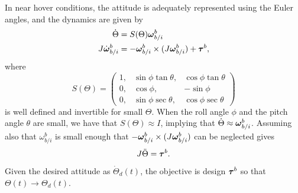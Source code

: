 In near hover conditions, the attitude is adequately represented using the Euler angles, and the dynamics are given by
\begin{align*}
	\dot{\Theta} &= S(\Theta)\boldsymbol{\omega}_{b/i}^b \\	
	J\dot{\boldsymbol{\omega}}_{b/i}^b &= -\boldsymbol{\omega}_{b/i}^b \times (J\boldsymbol{\omega}_{b/i}^b) + \boldsymbol{\tau}^b,
\end{align*}
where 
\[
S(\Theta)= \begin{pmatrix} 1, & \sin\phi\tan\theta, & \cos\phi\tan\theta \\
 0, & \cos\phi, & -\sin\phi \\
 0, & \sin\phi\sec\theta, & \cos\phi\sec\theta
 \end{pmatrix}
\]
is well defined and invertible for small $\Theta$.  When the roll angle $\phi$ and the pitch angle $\theta$ are small, we have that $S(\Theta)\approx I$, implying that $\dot{\Theta}\approx \boldsymbol{\omega}_{b/i}^b$.  Assuming also that $\omega_{b/i}^b$ is small enough that $-\boldsymbol{\omega}_{b/i}^b \times (J\boldsymbol{\omega}_{b/i}^b)$ can be neglected gives
\[
J\ddot{\Theta} = \boldsymbol{\tau}^b.
\]
Given the desired attitude as $\dot{\Theta}_d(t)$, the objective is design $\boldsymbol{\tau}^b$ so that $\Theta(t)\to \Theta_d(t)$.

